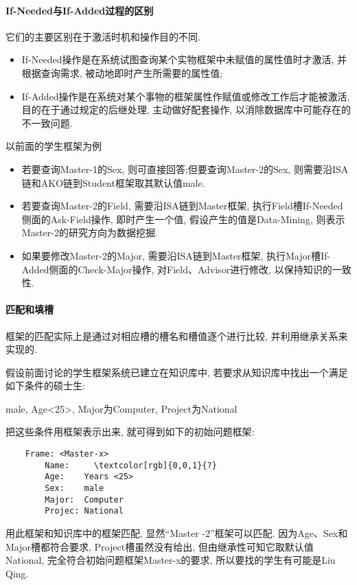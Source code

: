 \paragraph{If-Needed与If-Added过程的区别}
    它们的主要区别在于激活时机和操作目的不同.
\begin{itemize}
    \item If-Needed操作是在系统试图查询某个实物框架中未赋值的属性值时才激活, 并根据查询需求, 被动地即时产生所需要的属性值;
    \item If-Added操作是在系统对某个事物的框架属性作赋值或修改工作后才能被激活, 目的在于通过规定的后继处理, 主动做好配套操作, 以消除数据库中可能存在的不一致问题.
\end{itemize}
\begin{example}
以前面的学生框架为例
\begin{itemize}
    \item 若要查询Master-1的Sex, 则可直接回答;但要查询Master-2的Sex, 则需要沿ISA链和AKO链到Student框架取其默认值male.
    \item 若要查询Master-2的Field, 需要沿ISA链到Master框架, 执行Field槽If-Needed侧面的Ask-Field操作, 即时产生一个值, 假设产生的值是Data-Mining, 则表示Master-2的研究方向为数据挖掘.
    \item 如果要修改Master-2的Major, 需要沿ISA链到Master框架, 执行Major槽If-Added侧面的Check-Major操作, 对Field、Advisor进行修改, 以保持知识的一致性.
\end{itemize}
\end{example}
\paragraph{匹配和填槽}
    框架的匹配实际上是通过对相应槽的槽名和槽值逐个进行比较, 并利用继承关系来实现的.
\begin{example}
    假设前面讨论的学生框架系统已建立在知识库中, 若要求从知识库中找出一个满足如下条件的硕士生:
\begin{center}
    male, Age<25>, Major为Computer, Project为National
\end{center}
    把这些条件用框架表示出来, 就可得到如下的初始问题框架:
\begin{Verbatim}
    Frame: <Master-x>
        Name:     \textcolor[rgb]{0,0,1}{?}
        Age:    Years <25>
        Sex:    male
        Major:  Computer
        Projec: National
\end{Verbatim}
\end{example}
    用此框架和知识库中的框架匹配, 显然“Master -2”框架可以匹配. 因为Age、Sex和Major槽都符合要求, Project槽虽然没有给出, 但由继承性可知它取默认值National, 完全符合初始问题框架Master-x的要求, 所以要找的学生有可能是Liu Qing.
